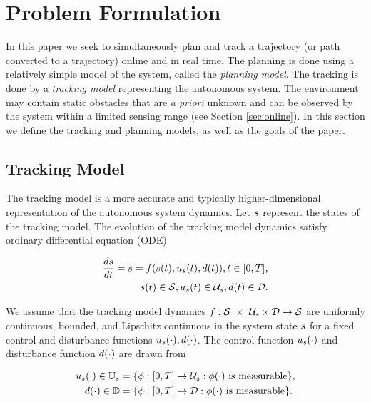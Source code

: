 \section{Problem Formulation \label{sec:formulation}}
In this paper we seek to simultaneously plan and track a trajectory (or path converted to a trajectory) online and in real time. 
The planning is done using a relatively simple model of the system, called the \textit{planning model}. 
The tracking is done by a \textit{tracking model} representing the autonomous system. 
The environment may contain static obstacles that are \textit{a priori} unknown and can be observed by the system within a limited sensing range (see Section \ref{sec:online}). 
In this section we define the tracking and planning models, as well as the goals of the paper.

\subsection{Tracking  Model}
The tracking model is a more accurate and typically higher-dimensional representation of the autonomous system dynamics. 
Let $s$ represent the states of the tracking model. 
The evolution of the tracking model dynamics satisfy ordinary differential equation (ODE)

\begin{equation}
\begin{aligned}
\label{eq:tdyn}
\frac{d\tstate}{d\tvar} = \dot{\tstate} = \tdyn(\tstate(\tvar), \tctrl(\tvar), \dstb(\tvar)), \tvar \in [0, \thor], \\
\tstate(\tvar) \in \tset, \tctrl(\tvar) \in \tcset, \dstb(\tvar) \in \dset.
\end{aligned}
\end{equation}

We assume that the tracking model dynamics $f : \mathcal{S}\ \times\ \mathcal{U}_s \times \mathcal{D} \rightarrow \mathcal{S}$ are uniformly continuous, bounded, and Lipschitz continuous in the system state $s$ for a fixed control and disturbance functions $u_s(\cdot), d(\cdot)$. The control function $u_s(\cdot)$ and disturbance function $d(\cdot)$ are drawn from

\begin{align}
u_s(\cdot) \in \mathbb{U}_s &= \{\phi: [0, T] \rightarrow \mathcal{U}_s: \phi(\cdot) \text{ is measurable}\},\\
d(\cdot) \in \mathbb{D} &= \{\phi: [0, T] \rightarrow \mathcal{D}: \phi(\cdot) \text{ is measurable}\}.
\end{align}



